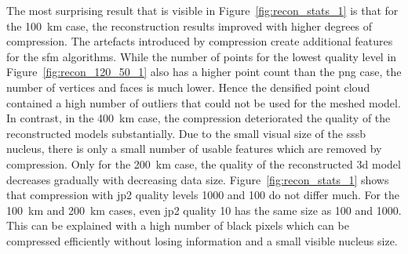 The most surprising result that is visible in Figure~\ref{fig:recon_stats_1} is that for the \SI{100}{\kilo\meter} case, the reconstruction results improved with higher degrees of compression. The artefacts introduced by compression create additional features for the \gls{sfm} algorithms. While the number of points for the lowest quality level in Figure~\ref{fig:recon_120_50_1} also has a higher point count than the \gls{png} case, the number of vertices and faces is much lower. Hence the densified point cloud contained a high number of outliers that could not be used for the meshed model. In contrast, in the \SI{400}{\kilo\meter} case, the compression deteriorated the quality of the reconstructed models substantially. Due to the small visual size of the \gls{sssb} nucleus, there is only a small number of usable features which are removed by compression. Only for the \SI{200}{\kilo\meter} case, the quality of the reconstructed \gls{3d} model decreases gradually with decreasing data size.
Figure~\ref{fig:recon_stats_1} shows that compression with \gls{jp2} quality levels 1000 and 100 do not differ much. For the \SI{100}{\kilo\meter} and \SI{200}{\kilo\meter} cases, even \gls{jp2} quality 10 has the same size as 100 and 1000. This can be explained with a high number of black pixels which can be compressed efficiently without losing information and a small visible nucleus size.

